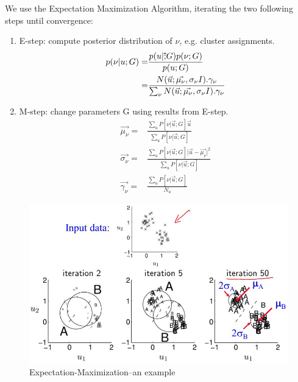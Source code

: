 \documentclass[]{article}
\begin{document}
\begin{figure}[H]
\begin{subfigure}[t]{0.45\textwidth}
	\end{subfigure}
\end{figure}

We use the Expectation Maximization Algorithm, iterating the two following steps until convergence:
\begin{enumerate}
	\item E-step: compute posterior distribution of $\nu$, e.g. cluster assignments.
	\begin{align*}
		p(\nu\vert u;G)=&\frac{p(u\vert \vu ;G) p(\nu;G)}{p(u;G)}\\
		=&\frac{N(\vec{u};\vec{\mu_\nu},\sigma_\nu I).\gamma_\nu}{\sum_\nu N(\vec{u};\vec{\mu_\nu},\sigma_\nu I).\gamma_\nu}
	\end{align*}
	\item M-step: change parameters G using results from E-step.
	\begin{align*}
		\vec{\mu_\nu} =&\frac{\sum_u P[\nu\vert \vec{u};G]\vec{u}}{\sum_u P[\nu\vert \vec{u};G]}\\
		\vec{\sigma_\nu} =&\frac{\sum_u P[\nu\vert \vec{u};G]\lvert \vec{u}-\vec{\mu_\nu}\rvert^2 }{\sum_u P[\nu\vert \vec{u};G]}\\
		\vec{\gamma_\nu} =&\frac{\sum_u P[\nu\vert \vec{u};G]}{N_u}
	\end{align*}
\end{enumerate}

\begin{figure}[H]
	\begin{center}
		\caption{Expectation-Maximization--an example}
		\includegraphics[width=\textwidth]{em-results}
	\end{center}
\end{figure}
\end{document}
